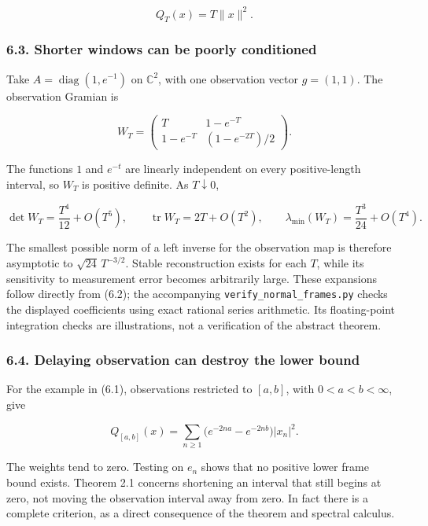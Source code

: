 \documentclass[
  11pt,
]{article}
\begin{document}
\[
Q_T(x)=T\|x\|^2.
\]

\subsubsection{6.3. Shorter windows can be poorly
conditioned}\label{shorter-windows-can-be-poorly-conditioned}

Take \(A=\operatorname{diag}(1,e^{-1})\) on \(\mathbb C^2\), with one
observation vector \(g=(1,1)\). The observation Gramian is

\[
W_T=\begin{pmatrix}
T&1-e^{-T}\\
1-e^{-T}&(1-e^{-2T})/2
\end{pmatrix}.                                  \tag{6.2}
\]

The functions \(1\) and \(e^{-t}\) are linearly independent on every
positive-length interval, so \(W_T\) is positive definite. As
\(T\downarrow0\),

\[
\det W_T=\frac{T^4}{12}+O(T^5),\qquad
\operatorname{tr}W_T=2T+O(T^2),\qquad
\lambda_{\min}(W_T)=\frac{T^3}{24}+O(T^4).       \tag{6.3}
\]

The smallest possible norm of a left inverse for the observation map is
therefore asymptotic to \(\sqrt{24}\,T^{-3/2}\). Stable reconstruction
exists for each \(T\), while its sensitivity to measurement error
becomes arbitrarily large. These expansions follow directly from (6.2);
the accompanying \texttt{verify\_normal\_frames.py} checks the displayed
coefficients using exact rational series arithmetic. Its floating-point
integration checks are illustrations, not a verification of the abstract
theorem.

\subsubsection{6.4. Delaying observation can destroy the lower
bound}\label{delaying-observation-can-destroy-the-lower-bound}

For the example in (6.1), observations restricted to \([a,b]\), with
\(0<a<b<\infty\), give

\[
Q_{[a,b]}(x)=\sum_{n\geq1}
\bigl(e^{-2na}-e^{-2nb}\bigr)|x_n|^2.            \tag{6.4}
\]

The weights tend to zero. Testing on \(e_n\) shows that no positive
lower frame bound exists. Theorem 2.1 concerns shortening an interval
that still begins at zero, not moving the observation interval away from
zero. In fact there is a complete criterion, as a direct consequence of
the theorem and spectral calculus.
\end{document}
